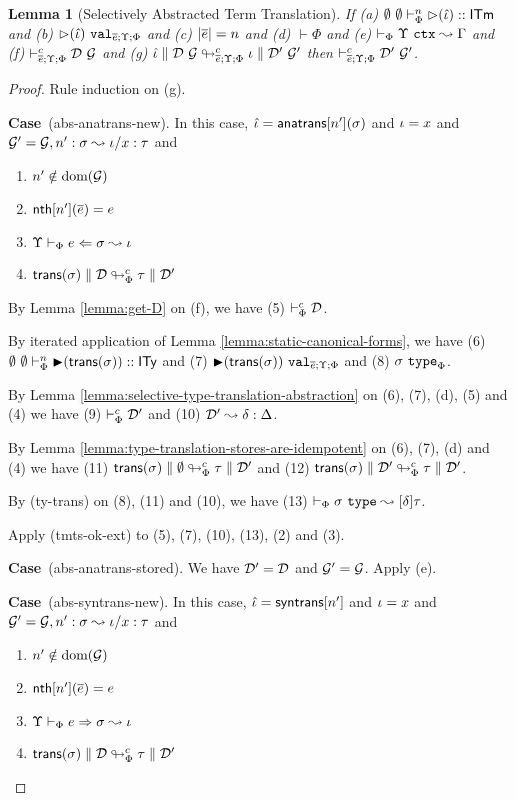 \documentclass[12pt]{article}
\newtheorem{lemma}{Lemma}
\newcommand{\pfcase}[1]{\textbf{Case}~#1. }
\begin{document}
\begin{lemma}[Selectively Abstracted Term Translation]
\label{lemma:selectively-abstracted-term-translations}
If (a) $\sofkVX{\sqitm{\qitm}}{\kitm}$ and (b) $\sval{\sqitm{\qitm}}{\es;\Upsilon;\Phi}$ and (c) $|\es|=n$ and (d) $\vdash \Phi$ and (e) $\ctxtransX{\Upsilon}{\Gamma}$ and (f) $\tmtsvX{\memD}{\memG}$ and (g) $\edeabs{c}{\es;\Upsilon;\Phi}{\qitm}{\memD}{\memG}{\itm}{\memD'}{\memG'}$ then $\tmtsvX{\memD'}{\memG'}$.
\end{lemma}
\begin{proof} Rule induction on (g).

\pfcase{(abs-anatrans-new)} In this case, $\qitm=\anatrans{n'}{\st}$ and $\itm=x$ and $\memG'=\memG, n' : \st \leadsto \iota/x : \tau$ and \begin{enumerate}
    \item $n' \notin \text{dom}(\memG)$
    \item $\keyw{nth}[n'](\es)=e$
    \item $\eanaX{e}{\st}{\iota}$
    \item $\tdeabs{\Phi}{c}{\srep{\st}}{\memD}{\tau}{\memD'}$
\end{enumerate}

By Lemma \ref{lemma:get-D} on (f), we have (5) $\tytsvX{\memD}$.

By iterated application of Lemma \ref{lemma:static-canonical-forms}, we have (6) $\sofkVX{\sqity{\srep{\st}}}{\kity}$ and (7) $\sval{\sqity{\srep{\st}}}{\es;\Upsilon;\Phi}$ and (8) $\istype{\st}{\Phi}$.

By Lemma \ref{lemma:selective-type-translation-abstraction} on (6), (7), (d), (5) and (4) we have (9) $\tytsvX{\memD'}$ and (10) $\memD' \leadsto \delta : \Delta$.

By Lemma \ref{lemma:type-translation-stores-are-idempotent} on (6), (7), (d) and (4) we have (11) $\tdeabs{\Phi}{c}{\srep{\st}}{\emptyset}{\tau}{\memD'}$ and (12) $\tdeabs{\Phi}{c}{\srep{\st}}{\memD'}{\tau}{\memD'}$.

By (ty-trans) on (8), (11) and (10), we have (13) $\tytransX{\st}{[\delta]\tau}$.

Apply (tmts-ok-ext) to (5), (7), (10), (13), (2) and (3).

\pfcase{(abs-anatrans-stored)} We have $\memD'=\memD$ and $\memG'=\memG$. Apply (e).

\pfcase{(abs-syntrans-new)}  In this case, $\qitm=\syntrans{n'}$ and $\itm=x$ and $\memG'=\memG, n' : \st \leadsto \iota/x : \tau$ and \begin{enumerate}
    \item $n' \notin \text{dom}(\memG)$
    \item $\keyw{nth}[n'](\es)=e$
    \item $\esynX{e}{\st}{\iota}$
    \item $\tdeabs{\Phi}{c}{\srep{\st}}{\memD}{\tau}{\memD'}$
\end{enumerate}


\end{proof}
\end{document}

